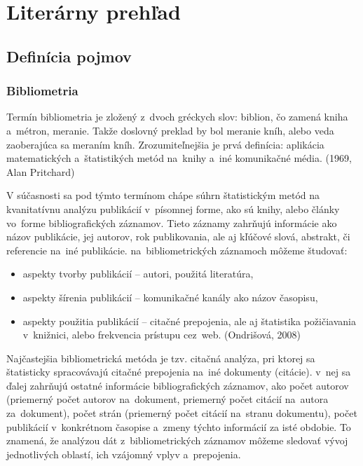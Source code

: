 \chapter{Literárny prehľad}
\setcounter{page}{1}

\section{Definícia pojmov}

\subsection{Bibliometria}

\citet{ref1}

Termín bibliometria je zložený z~dvoch gréckych slov: biblion, čo zamená kniha
a~métron, meranie. Takže doslovný preklad by bol meranie kníh, alebo veda
zaoberajúca sa meraním kníh. Zrozumiteľnejšia je prvá definícia: aplikácia
matematických a~štatistikých metód na~knihy a~iné komunikačné média. (1969, Alan
Pritchard)

V súčasnosti sa pod týmto termínom chápe súhrn štatistickým metód na
kvanitatívnu analýzu publikácií v~písomnej forme, ako sú knihy, alebo články
vo~forme bibliografických záznamov. Tieto záznamy zahrňujú informácie ako názov
publikácie, jej autorov, rok publikovania, ale aj kľúčové slová, abstrakt, či
referencie na~iné publikácie. na~bibliometrických záznamoch môžeme študovať:

\begin{itemize}
\item aspekty tvorby publikácií -- autori, použitá literatúra,
\item aspekty šírenia publikácií -- komunikačné kanály ako názov časopisu,
\item aspekty použitia publikácií -- citačné prepojenia, ale aj štatistika
  požičiavania v~knižnici, alebo frekvencia prístupu cez~web. (Ondrišová, 2008)
\end{itemize}

Najčastejšia bibliometrická metóda je tzv. citačná analýza, pri ktorej sa
štatisticky spracovávajú citačné prepojenia na~iné dokumenty (citácie). v~nej sa
ďalej zahrňujú ostatné informácie bibliografických záznamov, ako počet autorov
(priemerný počet autorov na~dokument, priemerný počet citácií na~autora
za~dokument), počet strán (priemerný počet citácií na~stranu dokumentu), počet
publikácií v~konkrétnom časopise a~zmeny týchto informácií za isté obdobie. To
znamená, že analýzou dát z~bibliometrických záznamov môžeme sledovať vývoj
jednotlivých oblastí, ich vzájomný vplyv a~prepojenia.

